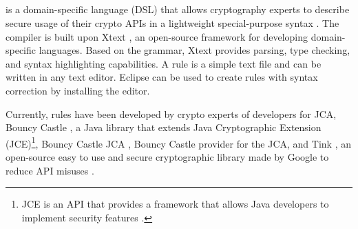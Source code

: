 \subsection{\crysl{}}
\label{subsec:crysl}
\crysl{} is a domain-specific language (DSL) that allows cryptography experts to describe secure usage of their crypto APIs in a lightweight special-purpose syntax \cite{skm19}. The \crySL compiler is built upon Xtext \cite{xtext}, an open-source framework for developing domain-specific languages. Based on the \crysl{} grammar, Xtext provides parsing, type checking, and syntax highlighting capabilities. A \crysl{} rule is a simple text file and can be written in any text editor. Eclipse can be used to create \crysl{} rules with syntax correction by installing the \crysl{} editor. 

Currently, \crysl{} rules have been developed by crypto experts of \cognicrypt{} developers for JCA, Bouncy Castle \cite{bc}, a Java library that extends Java Cryptographic Extension (JCE)\footnote{JCE is an API that provides a framework that allows Java developers to implement security features \cite{jce}.}, Bouncy Castle JCA \cite{bc}, Bouncy Castle provider for the JCA, and Tink \cite{tk}, an open-source easy to use and secure cryptographic library made by Google to reduce API misuses \cite{apirules}.

